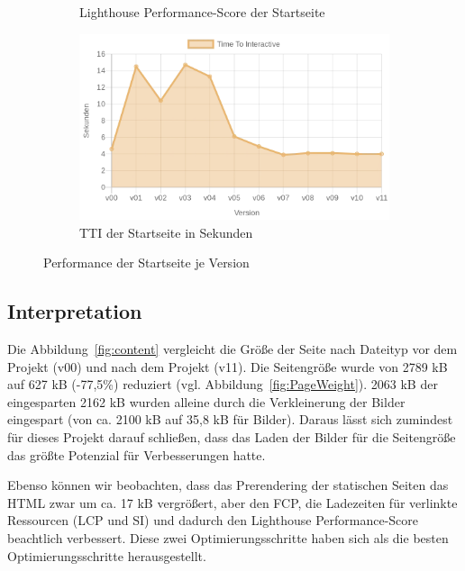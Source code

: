 \documentclass[11pt,a4paper]{article}
\begin{document}
\begin{figure}[h]
\begin{subfigure}{.5\textwidth}
    \caption{Lighthouse Performance-Score der Startseite}
    \label{fig:LHScore}
  \end{subfigure}
  \begin{subfigure}{.5\textwidth}
    \centering
    \includegraphics[width=.8\linewidth]{images/TTI.png}
    \caption{TTI der Startseite in Sekunden}
    \label{fig:TTI}
  \end{subfigure}
  \caption{Performance der Startseite je Version}
  \label{fig:performance}
\end{figure}

\subsection{Interpretation}
Die Abbildung~\ref{fig:content} vergleicht die Größe der Seite nach Dateityp vor dem Projekt (v00) und nach dem Projekt (v11).
Die Seitengröße wurde von 2789 kB auf 627 kB (-77,5\%) reduziert (vgl. Abbildung~\ref{fig:PageWeight}).
2063 kB der eingesparten 2162 kB wurden alleine durch die Verkleinerung der Bilder eingespart (von ca. 2100 kB auf 35,8 kB für Bilder).
Daraus lässt sich zumindest für dieses Projekt darauf schließen, dass das Laden der Bilder für die Seitengröße das größte Potenzial für Verbesserungen hatte.

Ebenso können wir beobachten, dass das Prerendering der statischen Seiten das HTML zwar um ca. 17 kB vergrößert, aber den FCP, die Ladezeiten für verlinkte Ressourcen (LCP und SI) und dadurch den Lighthouse Performance-Score beachtlich verbessert.
Diese zwei Optimierungsschritte haben sich als die besten Optimierungsschritte herausgestellt.
\end{document}
